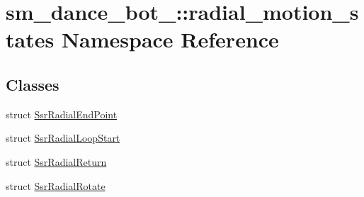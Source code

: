 \hypertarget{namespacesm__dance__bot__2_1_1radial__motion__states}{}\section{sm\+\_\+dance\+\_\+bot\+\_\+:\+:radial\+\_\+motion\+\_\+states Namespace Reference}
\label{namespacesm__dance__bot__2_1_1radial__motion__states}
\subsection*{Classes}
\begin{DoxyCompactItemize}
\item 
struct \hyperlink{structsm__dance__bot__2_1_1radial__motion__states_1_1SsrRadialEndPoint}{Ssr\+Radial\+End\+Point}
\item 
struct \hyperlink{structsm__dance__bot__2_1_1radial__motion__states_1_1SsrRadialLoopStart}{Ssr\+Radial\+Loop\+Start}
\item 
struct \hyperlink{structsm__dance__bot__2_1_1radial__motion__states_1_1SsrRadialReturn}{Ssr\+Radial\+Return}
\item 
struct \hyperlink{structsm__dance__bot__2_1_1radial__motion__states_1_1SsrRadialRotate}{Ssr\+Radial\+Rotate}
\end{DoxyCompactItemize}
